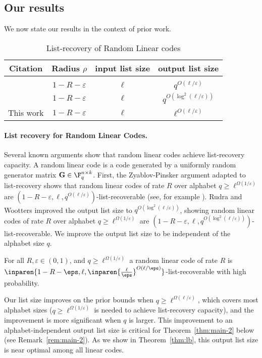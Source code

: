 \documentclass{article}
\begin{document}
\subsection{Our results}
We now state our results in the context of prior work.

\begin{table}[]
    \centering
    \begin{tabular}{c|c|c|c}
        Citation & Radius $\rho$ & input list size &output list size \\[0.5ex] 
        \hline & & &\\[-1.8ex]
        \cite{zyablov1981list,Gur04} & $1-R-\varepsilon$ & $\ell$ & $q^{O(\ell/\varepsilon)}$ \\
        \cite{rudra2018averageradius} & $1-R-\varepsilon$ & $\ell$ & $q^{O(\log^2(\ell/\varepsilon))}$ \\
        This work & $1-R-\varepsilon$ & $\ell$ & $\ell^{O(\ell/\varepsilon)}$ \\
    \end{tabular}
    \caption{List-recovery of Random Linear codes}
    \label{tab:rlc}
\end{table}

\paragraph{List recovery for Random Linear Codes.} 
Several known arguments show that random linear codes achieve list-recovery capacity.
A random linear code is a code generated by a uniformly random generator matrix $\mathbf{G} \in\F_q^{n\times k}$.
First, the Zyablov-Pinsker argument \cite{zyablov1981list} adapted to list-recovery shows that random linear codes of rate $R$ over alphabet $q\ge \ell^{\Omega(1/\varepsilon)}$ are $(1-R-\varepsilon, \ell, q^{O(\ell/\varepsilon)})$-list-recoverable (see, for example \cite[Lemma 9.6]{Gur04}).
Rudra and Wootters \cite{rudra2018averageradius} improved the output list size to $q^{O(\log^2(\ell/\varepsilon))}$, showing random linear codes of rate $R$ over alphabet $q\ge \ell^{\Omega(1/\varepsilon)}$ are $(1-R-\varepsilon, \ell, q^{O(\log^2(\ell/\varepsilon))})$-list-recoverable. 
We improve the output list size to be independent of the alphabet size $q$.
\begin{theorem}
    For all $R,\varepsilon\in(0,1)$, and $q\ge \ell^{\Omega(1/\varepsilon)}$ a random linear code of rate $R$ is $\inparen{1-R-\eps, \ell, \inparen{\frac{\ell}{\eps}}^{O(\ell/\eps)}}$-list-recoverable with high probability.
    \label{thm:main-1}
\end{theorem}
Our list size improves on the prior bounds when $q\ge \ell^{\Omega(\ell/\varepsilon)}$, which covers most alphabet sizes ($q\ge \ell^{\Omega(1/\varepsilon)}$ is needed to achieve list-recovery capacity), and the improvement is more significant when $q$ is larger.
This improvement to an alphabet-independent output list size is critical for Theorem~\ref{thm:main-2} below (see Remark~\ref{rem:main-2}).
As we show in Theorem~\ref{thm:lb}, this output list size is near optimal among all linear codes.
\end{document}
